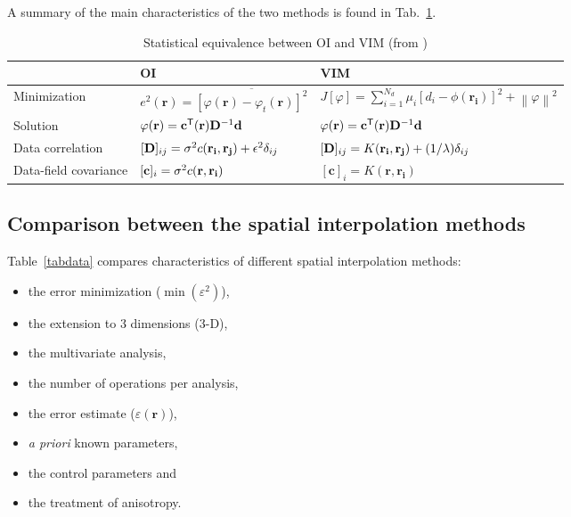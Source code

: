 A summary of the main characteristics of the two methods is found in Tab.~\ref{tabOAVIM}.

\begin{table}[htpb]
\caption[Statistical equivalence between OI and VIM]{Statistical equivalence between OI and VIM (from \citet{RIXEN00})\label{tabOAVIM}}
\begin{tabular*}{0.99\textwidth}{@{\extracolsep{\fill}}lll}
\toprule
											&		OI	& VIM \\
\midrule
Minimization \rule{0pt}{3ex}	& $e^{2}(\mathbf{r})= \overline{ [\varphi(\mathbf{r})-\varphi_{t}(\mathbf{r})]^{2}}$ 	& $J[\varphi]=\sum_{i=1}^{N_d}\mu_{i}[d_{i}-\phi(\mathbf{r_{i}})]^{2}+\left\|\varphi\right\|^{2}$							\\
Solution						& $\varphi(\mathbf{r})= {\mathbf{c}}^\mathsf{T}(\mathbf{r})\mathbf{D}^{-1}\mathbf{d}$			& 
$\varphi(\mathbf{r})= {\mathbf{c}}^\mathsf{T}(\mathbf{r})\mathbf{D}^{-1}\mathbf{d}$												\\
Data correlation				& $[\mathbf{D}]_{ij}=\sigma^{2} c(\mathbf{r_{i}},\mathbf{r_{j}})+\epsilon^{2}\delta_{ij}$& $[\mathbf{D}]_{ij}=K(\mathbf{r_i},\mathbf{r_j})+(1/\lambda)\delta_{ij}$														\\
Data-field covariance 			& $[\mathbf{c}]_{i}=\sigma^{2} c(\mathbf{r},\mathbf{r_{i}})$							& $[\mathbf{c}]_{i}=K(\mathbf{r},\mathbf{r_{i}})$																			\\
\bottomrule
\end{tabular*}
\end{table}

\subsection{Comparison between the spatial interpolation methods}

Table~\ref{tabdata} compares characteristics of different spatial interpolation methods: 
\begin{itemize}
\item the error minimization ($\min( \varepsilon^2)$),
\item the extension to 3 dimensions (3-D), 
\item the multivariate analysis, 
\item the number of operations per analysis, 
\item the error estimate ($\varepsilon(\mathbf{r})$),
\item \textit{a priori} known parameters, 
\item the control parameters and 
\item the treatment of anisotropy. 
\end{itemize} 

